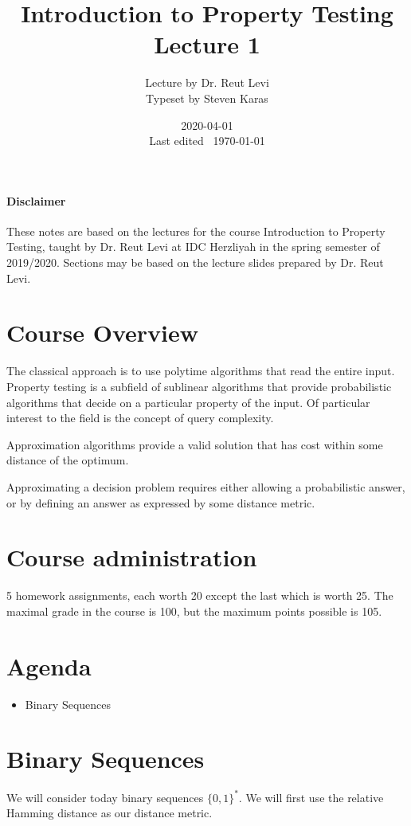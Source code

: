 \documentclass{idc_msc}
\title{Introduction to Property Testing \\\large Lecture 1}
\date{2020-04-01 \\ Last edited \currenttime\ \today}
\author{Lecture by Dr. Reut Levi\\Typeset by Steven Karas}
\begin{document}
\nocite{goldreich2017introduction}

\paragraph{Disclaimer}

These notes are based on the lectures for the course Introduction to Property Testing, taught by Dr. Reut Levi at IDC Herzliyah in the spring semester of 2019/2020.
Sections may be based on the lecture slides prepared by Dr. Reut Levi.

\section{Course Overview}

  The classical approach is to use polytime algorithms that read the entire input.
  Property testing is a subfield of sublinear algorithms that provide probabilistic algorithms that decide on a particular property of the input.
  Of particular interest to the field is the concept of query complexity.

  Approximation algorithms provide a valid solution that has cost within some distance of the optimum.

  Approximating a decision problem requires either allowing a probabilistic answer, or by defining an answer as expressed by some distance metric.

\section{Course administration}

  5 homework assignments, each worth 20 except the last which is worth 25.
  The maximal grade in the course is 100, but the maximum points possible is 105.

\section{Agenda}

  \begin{itemize}
    \item Binary Sequences
  \end{itemize}

\section{Binary Sequences}

We will consider today binary sequences \({\{0, 1\}}^{*}\).
We will first use the relative Hamming distance as our distance metric.
\end{document}
